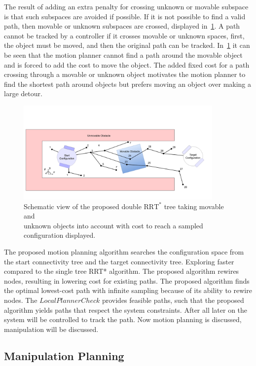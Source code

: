 The result of adding an extra penalty for crossing unknown or movable subspace is that such subspaces are avoided if possible. If it is not possible to find a valid path, then movable or unknown subspaces are crossed, displayed in~\cref{fig:double_rrt_alg}. A path cannot be tracked by a controller if it crosses movable or unknown spaces, first, the object must be moved, and then the original path can be tracked. In~\cref{fig:double_rrt_alg} it can be seen that the motion planner cannot find a path around the movable object and is forced to add the cost to move the object. The added fixed cost for a path crossing through a movable or unknown object motivates the motion planner to find the shortest path around objects but prefers moving an object over making a large detour.\bs

\begin{figure}[H]
    \centering
    \includegraphics[width=0.9\textwidth]{figures/rrt_with_costs.png}
    \caption{Schematic view of the proposed double $\text{RRT}^*$ tree taking movable and\\unknown objects into account with cost to reach a sampled configuration displayed.}
    \label{fig:double_rrt_alg}
\end{figure}

The proposed motion planning algorithm searches the configuration space from the start connectivity tree and the target connectivity tree. Exploring faster compared to the single tree \ac{RRT*} algorithm. The proposed algorithm rewires nodes, resulting in lowering cost for existing paths. The proposed algorithm finds the optimal lowest-cost path with infinite sampling because of its ability to rewire nodes. The $LocalPlannerCheck$ provides feasible paths, such that the proposed algorithm yields paths that respect the system constraints. After all later on the system will be controlled to track the path. Now motion planning is discussed, manipulation will be discussed.

\subsection{Manipulation Planning}%
\label{subsec:manipulation_planning}
